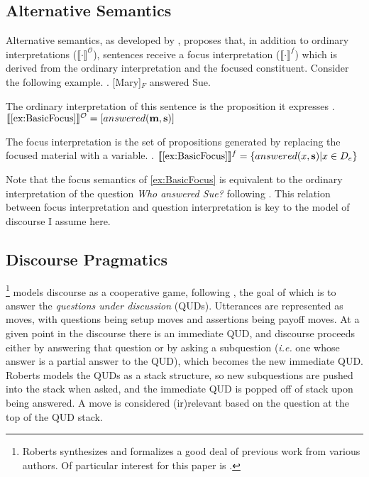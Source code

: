 \documentclass[letterpaper]{article}
\begin{document}
\subsection{Alternative Semantics \parencite{rooth1992theory}}\label{sec:rooth}
Alternative semantics, as developed by \textcite{rooth1992theory}, proposes that, in addition to ordinary interpretations ($\llbracket\cdot\rrbracket^\mathcal{O}$), sentences receive a focus interpretation ($\llbracket\cdot\rrbracket^f$) which is derived from the ordinary interpretation and the focused constituent.
Consider the following example.
\ex.\label{ex:BasicFocus} [Mary]$_F$ answered Sue.

The ordinary interpretation of this sentence is the proposition it expresses
\ex.\label{ex:OrdinaryInterpretation} $\llbracket\ref{ex:BasicFocus}\rrbracket^\mathcal{O} = [answered(\mathbf{m}, \mathbf{s})]$

The focus interpretation is the set of propositions generated by replacing the focused material with a variable.
\ex.\label{ex:FocusInterpretation} $\llbracket\ref{ex:BasicFocus}\rrbracket^f = \left\{ answered(x, \mathbf{s}) | x \in D_e \right\}$

Note that the focus semantics of \ref{ex:BasicFocus} is equivalent to the ordinary interpretation of the question \textit{Who answered Sue?} following \textcite{hamblin1973questions}. 
This relation between focus interpretation and question interpretation is key to the model of discourse I assume here.

\subsection{Discourse Pragmatics \parencite{roberts2012information}}\label{sec:roberts}
\textcite{roberts2012information}\footnote{
	Roberts synthesizes and formalizes a good deal of previous work from various authors.
	Of particular interest for this paper is \textcite{rooth1992theory,krifka1992compositional,stechow1991focusing,jackendoff1972semantics}.
} models discourse as a cooperative game, following \textcite{lewis1979scorekeeping}, the goal of which is to answer the \textit{questions under discussion} (QUDs).
Utterances are represented as moves, with questions being setup moves and assertions being payoff moves.
At a given point in the discourse there is an immediate QUD, and discourse proceeds either by answering that question or by asking a subquestion (\textit{i.e.} one whose answer is a partial answer to the QUD), which becomes the new immediate QUD.
Roberts models the QUDs as a stack structure, so new subquestions are pushed into the stack when asked, and the immediate QUD is popped off of stack upon being answered.
A move is considered (ir)relevant based on the question at the top of the QUD stack.
\end{document}
